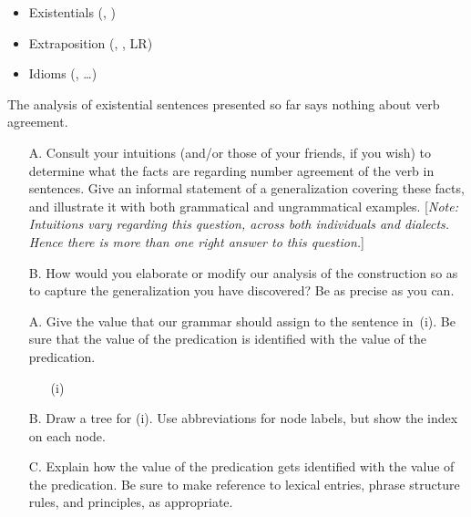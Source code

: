 \documentclass[a4paper,landscape,headrule,footrule]{foils}
\begin{document}

\begin{itemize}
\item Existentials (, )
\item Extraposition (, , LR)
\item Idioms (, \ldots)
\end{itemize}


The analysis of existential  sentences presented so far
says nothing about verb agreement.

\begin{itemize}
\item[A.] Consult your intuitions (and/or those of your friends, if
  you wish) to determine what the facts are regarding number
 agreement of the verb in  sentences.
 Give an informal statement of a generalization covering these facts,
 and illustrate it with both grammatical and ungrammatical examples.
 [{\sl Note: Intuitions vary regarding this question, across both
    individuals and  dialects.  Hence there is more
    than one right answer to this question.}]

\item[B.] How would you elaborate or modify our analysis of the 
  construction so as to capture the generalization you have discovered?
  Be as precise as you can.
\end{itemize}



\begin{itemize}
\item[A.] Give the  value that our grammar should assign to
the sentence in~(i).  Be sure that the  value of the 
predication
is identified with the  value of the 
predication.

\begin{itemize}
\item[(i)] 
\end{itemize}


\item[B.] Draw a tree for (i).  Use abbreviations for node labels, but
  show the index on each node.

\item[C.] Explain how the  value of the  
predication
gets identified with the  value of the  
predication.
Be sure to make reference to lexical entries, phrase structure rules,
and principles, as appropriate.

\end{itemize}
\end{document}

